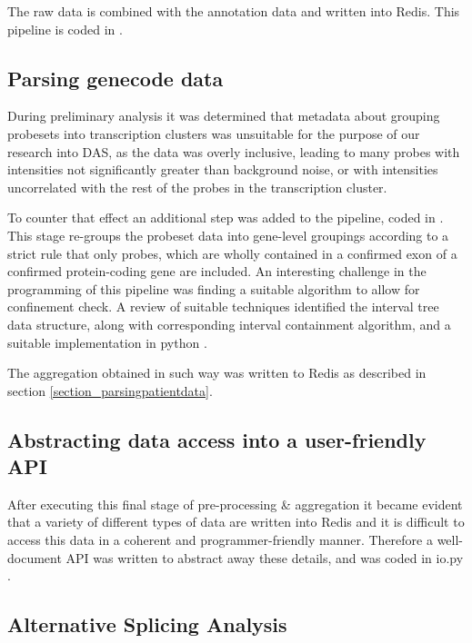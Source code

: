 The raw data is combined with the annotation data and written into Redis. This pipeline is coded in \cite{ProcessMicroarrays2017}.

\subsection{Parsing genecode data} \label{section_parsinggenecode}

During preliminary analysis it was determined that metadata about grouping probesets into transcription clusters was unsuitable for the purpose of our research into DAS, as the data was overly inclusive, leading to many probes with intensities not significantly greater than background noise, or with intensities uncorrelated with the rest of the probes in the transcription cluster.

To counter that effect an additional step was added to the pipeline, coded in \cite{ComputeAS22017}. This stage re-groups the probeset data into gene-level groupings according to a strict rule that only probes, which are wholly contained in a confirmed exon of a confirmed protein-coding gene are included. An interesting challenge in the programming of this pipeline was finding a suitable algorithm to allow for confinement check. A review of suitable techniques identified the interval tree data structure, along with corresponding interval containment algorithm, and a suitable implementation in python \parencite{intervaltree2013}.

The aggregation obtained in such way was written to Redis as described in section \ref{section_parsingpatientdata}.

\subsection{Abstracting data access into a user-friendly API}

After executing this final stage of pre-processing \& aggregation it became evident that a variety of different types of data are written into Redis and it is difficult to access this data in a coherent and programmer-friendly manner. Therefore a well-document API was written to abstract away these details, and was coded in io.py \parencite{io2017}.

\subsection{Alternative Splicing Analysis}

